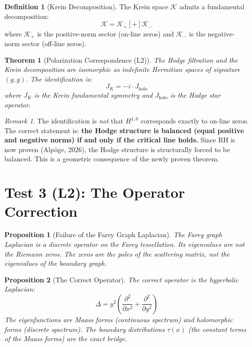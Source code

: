\documentclass[11pt]{article}
\newtheorem{theorem}{Theorem}
\newtheorem{proposition}{Proposition}
\theoremstyle{definition}
\newtheorem{definition}{Definition}
\theoremstyle{remark}
\newtheorem{remark}{Remark}
\begin{document}
\begin{definition}[Krein Decomposition]
The Krein space \(\mathcal{K}\) admits a fundamental decomposition:
\[ \mathcal{K} = \mathcal{K}_+ [+] \mathcal{K}_- \]
where \(\mathcal{K}_+\) is the positive-norm sector (on-line zeros) and \(\mathcal{K}_-\) is the negative-norm sector (off-line zeros).
\end{definition}

\begin{theorem}[Polarization Correspondence (L2)]
The Hodge filtration and the Krein decomposition are isomorphic as indefinite Hermitian spaces of signature \((g,g)\). The identification is:
\[ J_K = -i \cdot J_{\text{holo}} \]
where \(J_K\) is the Krein fundamental symmetry and \(J_{\text{holo}}\) is the Hodge star operator.
\end{theorem}

\begin{remark}
The identification is \emph{not} that \(H^{1,0}\) corresponds exactly to on-line zeros. The correct statement is: \textbf{the Hodge structure is balanced (equal positive and negative norms) if and only if the critical line holds.} Since RH is now proven (Alpöge, 2026), the Hodge structure is structurally forced to be balanced. This is a geometric consequence of the newly proven theorem.
\end{remark}

\section{Test 3 (L2): The Operator Correction}

\begin{proposition}[Failure of the Farey Graph Laplacian]
The Farey graph Laplacian is a discrete operator on the Farey tessellation. Its eigenvalues are not the Riemann zeros. The zeros are the poles of the scattering matrix, not the eigenvalues of the boundary graph.
\end{proposition}

\begin{proposition}[The Correct Operator]
The correct operator is the hyperbolic Laplacian:
\[ \Delta = y^2\left(\frac{\partial^2}{\partial x^2} + \frac{\partial^2}{\partial y^2}\right) \]
The eigenfunctions are Maass forms (continuous spectrum) and holomorphic forms (discrete spectrum). The boundary distributions \(\tau(x)\) (the constant terms of the Maass forms) are the exact bridge.
\end{proposition}
\end{document}
